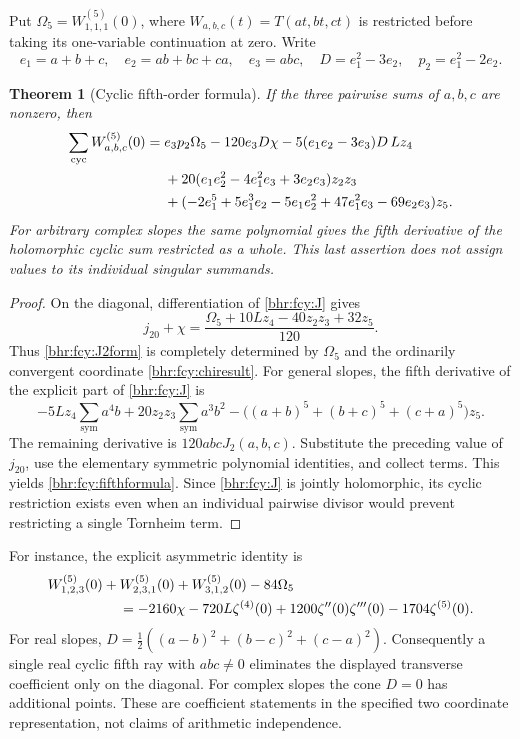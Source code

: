 \documentclass[11pt]{article}
\numberwithin{equation}{section}
\theoremstyle{plain}
\newtheorem{theorem}{Theorem}[section]
\theoremstyle{definition}
\theoremstyle{remark}
\begin{document}
Put \(\Omega_5=W_{1,1,1}^{(5)}(0)\), where
\(W_{a,b,c}(t)=T(at,bt,ct)\) is restricted before taking its
one-variable continuation at zero. Write
\[
 e_1=a+b+c,\quad e_2=ab+bc+ca,\quad e_3=abc,\quad
 D=e_1^2-3e_2,\quad p_2=e_1^2-2e_2.
\]

\begin{theorem}[Cyclic fifth-order formula]\label{bhr:fcy:fifth}
If the three pairwise sums of \(a,b,c\) are nonzero, then
\begin{align}
 \sum_{\mathrm{cyc}}W_{a,b,c}^{(5)}(0)={}&
 e_3p_2\Omega_5-120e_3D\chi
 -5(e_1e_2-3e_3)D\,Lz_4\notag\\
 &+20(e_1e_2^2-4e_1^2e_3+3e_2e_3)z_2z_3\notag\\
 &+(-2e_1^5+5e_1^3e_2-5e_1e_2^2
                         +47e_1^2e_3-69e_2e_3)z_5.
 \label{bhr:fcy:fifthformula}
\end{align}
For arbitrary complex slopes the same polynomial gives the fifth
derivative of the holomorphic cyclic sum restricted as a whole.
This last assertion does not assign values to its individual
singular summands.
\end{theorem}

\begin{proof}
On the diagonal, differentiation of \eqref{bhr:fcy:J} gives
\[
 j_{20}+\chi=\frac{
 \Omega_5+10Lz_4-40z_2z_3+32z_5}{120}.
\]
Thus \eqref{bhr:fcy:J2form} is completely determined by
\(\Omega_5\) and the ordinarily convergent coordinate
\eqref{bhr:fcy:chiresult}. For general slopes, the fifth derivative
of the explicit part of \eqref{bhr:fcy:J} is
\[
 -5Lz_4\sum_{\mathrm{sym}}a^4b
 +20z_2z_3\sum_{\mathrm{sym}}a^3b^2
 -\bigl((a+b)^5+(b+c)^5+(c+a)^5\bigr)z_5.
\]
The remaining derivative is \(120abcJ_2(a,b,c)\).
Substitute the preceding value of \(j_{20}\), use the elementary
symmetric polynomial identities, and collect terms. This yields
\eqref{bhr:fcy:fifthformula}. Since \eqref{bhr:fcy:J} is jointly
holomorphic, its cyclic restriction exists even when an individual
pairwise divisor would prevent restricting a single Tornheim term.
\end{proof}

For instance, the explicit asymmetric identity is
\begin{align}
 &W_{1,2,3}^{(5)}(0)+W_{2,3,1}^{(5)}(0)+W_{3,1,2}^{(5)}(0)
       -84\Omega_5\notag\\
 &\hspace{18mm}=-2160\chi-720L\zeta^{(4)}(0)
       +1200\zeta''(0)\zeta'''(0)-1704\zeta^{(5)}(0).
 \label{bhr:fcy:example}
\end{align}
For real slopes, \(D=\tfrac12((a-b)^2+(b-c)^2+(c-a)^2)\).
Consequently a single real cyclic fifth ray with \(abc\ne0\)
eliminates the displayed transverse coefficient only on the
diagonal. For complex slopes the cone \(D=0\) has additional
points. These are coefficient statements in the specified two
coordinate representation, not claims of arithmetic independence.
\end{document}

